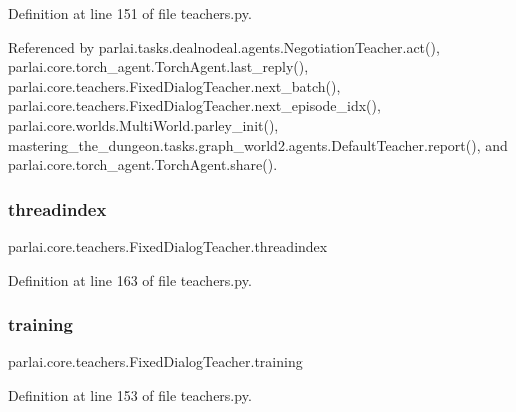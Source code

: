 Definition at line 151 of file teachers.\+py.



Referenced by parlai.\+tasks.\+dealnodeal.\+agents.\+Negotiation\+Teacher.\+act(), parlai.\+core.\+torch\+\_\+agent.\+Torch\+Agent.\+last\+\_\+reply(), parlai.\+core.\+teachers.\+Fixed\+Dialog\+Teacher.\+next\+\_\+batch(), parlai.\+core.\+teachers.\+Fixed\+Dialog\+Teacher.\+next\+\_\+episode\+\_\+idx(), parlai.\+core.\+worlds.\+Multi\+World.\+parley\+\_\+init(), mastering\+\_\+the\+\_\+dungeon.\+tasks.\+graph\+\_\+world2.\+agents.\+Default\+Teacher.\+report(), and parlai.\+core.\+torch\+\_\+agent.\+Torch\+Agent.\+share().

\mbox{\label{classparlai_1_1core_1_1teachers_1_1FixedDialogTeacher_a4443c43dc20f8f817c8cf28e2d795d6d}} 
\subsubsection{\texorpdfstring{threadindex}{threadindex}}
{\footnotesize\ttfamily parlai.\+core.\+teachers.\+Fixed\+Dialog\+Teacher.\+threadindex}



Definition at line 163 of file teachers.\+py.

\mbox{\label{classparlai_1_1core_1_1teachers_1_1FixedDialogTeacher_af64b55521fe587c17696b0b805a2b0d4}} 
\subsubsection{\texorpdfstring{training}{training}}
{\footnotesize\ttfamily parlai.\+core.\+teachers.\+Fixed\+Dialog\+Teacher.\+training}



Definition at line 153 of file teachers.\+py.



